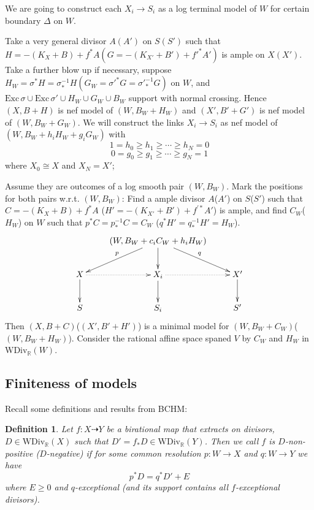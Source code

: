 \documentclass{article}
\newtheorem{defn}{Definition}[section]
\begin{document}
We are going to construct each  $ X_i\to S_i $ as a log terminal model of $ W $ for certain  boundary $ \Delta $ on $ W $. 

Take a very general divisor $ A(A') $ on $ S(S') $ such that $ H=-(K_X+B)+f^*A (G=-(K_{X'}+B')+f'^*A') $ is ample on $ X(X') $. Take a further blow up if necessary, suppose $ H_W=\sigma^*H=\sigma^{-1}_*H(G_W=\sigma'^*G=\sigma'^{-1}_*G) $ on $ W $, and $ \mathrm{Exc}\,\sigma\cup \mathrm{Exc}\,\sigma'\cup H_W\cup G_W\cup B_W $ support with normal crossing. Hence $ (X,B+H) $ is nef model of $ (W,B_W+H_W) $ and $ (X',B'+G') $ is nef model of $ (W,B_W+G_W) $. We will construct the links $ X_i\to S_i $ as nef model of $ (W,B_W+h_iH_W+g_iG_W) $ with 
  $$ 1=h_0\geqslant h_1\geqslant\cdots \geqslant h_N=0 $$
  $$ 0=g_0\geqslant g_1\geqslant\cdots \geqslant g_N=1 $$ 
  where $ X_0\cong X $ and $ X_N=X' $;



Assume they are outcomes of a log smooth pair $ (W,B_W) $. Mark the positions for both pairs w.r.t. $ (W,B_W) $: Find a ample divisor $ A $($ A' $) on $ S $($ S' $) such that $ C=-(K_X+B)+f^*A $ ($ H'=-(K_{X'}+B')+f^{'*}A' $) is ample, and find $ C_W $($ H_W $) on $ W $ such that $ p^*C=p^{-1}_*C=C_W $ ($ q^*H'=q^{-1}_*H'=H_W $). 
$$ \xymatrix{
  &(W,B_W+c_iC_W+h_iH_W)\ar[d]\ar[ld]_p\ar[rd]^{q}&\\
  X\ar[d]\ar@{.>}[r]&X_i\ar@{.>}[r]\ar[d]&X'\ar[d]\\
  S&S_i&S'} $$ 
Then $ (X,B+C) $($ (X',B'+H') $) is a minimal model for $ (W,B_W+C_W) $($ (W,B_W+H_W) $).  Consider the rational affine space spaned $ V $ by $ C_W $ and $ H_W $ in $ \mathrm{WDiv}_\mathbb{R}(W) $.
\subsection{Finiteness of models}
Recall some definitions and results from BCHM:
\begin{defn}
  Let $ f:X\dashrightarrow Y$ be a birational map that extracts on divisors, $ D\in \mathrm{WDiv}_\mathbb{R}(X) $ such that $ D'=f_*D\in \mathrm{WDiv}_\mathbb{R}(Y) $. Then we call $ f $ is $ D $-non-positive ($ D $-negative) if for some common resolution $ p:W\to X $ and $ q:W\to Y $ we have
  $$ p^*D=q^*D'+E $$
  where $ E\geqslant 0 $ and $ q $-exceptional (and its support contains all $ f $-exceptional divisors). 
\end{defn}
\end{document}
